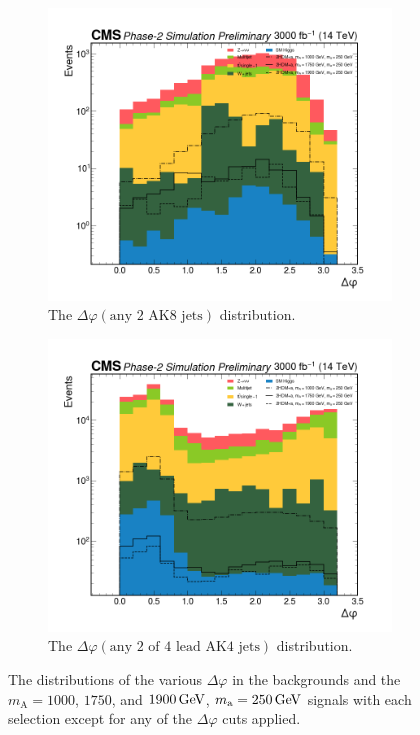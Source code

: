 \begin{figure}[ht]
    \begin{subfigure}[b]{0.45\textwidth}
        \centering
        \includegraphics[width=\textwidth]{Chapters/Strategy/selections/AK8_QCD_veto.png}
        \caption{The $\Delta\varphi(\text{any 2 AK8 jets})$ distribution.}
        \label{fig:dphi2ak8}
    \end{subfigure}
    \hfill
    \begin{subfigure}[b]{0.45\textwidth}
        \centering
        \includegraphics[width=\textwidth]{Chapters/Strategy/selections/AK4_QCD_veto.png}
        \caption{The $\Delta\varphi(\text{any 2 of 4 lead AK4 jets})$ distribution.}
        \label{fig:dphi2o4ak4}
    \end{subfigure}
    \caption{The distributions of the various $\Delta\varphi$ in the backgrounds and the $m_\mathrm{A} =1000$, $1750$, and $\GeV{1900}$, $m_\mathrm{a} = \GeV{250}$ signals with each selection except for any of the $\Delta\varphi$ cuts applied.}
    \label{fig:dphi}
\end{figure}

